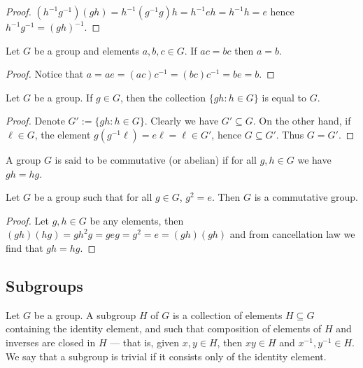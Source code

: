 \begin{proof}
\((h^{-1} g^{-1})(g h) = h^{-1} (g^{-1} g) h = h^{-1} e h = h^{-1} h = e\)
hence \(h^{-1} g^{-1} = (g h)^{-1}\).
\end{proof}

\begin{proposition}[Cancellation]
Let \(G\) be a group and elements \(a, b, c \in G\). If \(a c = b c\) then
\(a = b\).
\end{proposition}

\begin{proof}
Notice that \(a = a e = (a c) c^{-1} = (b c) c^{-1} = b e = b\).
\end{proof}

\begin{proposition}
Let \(G\) be a group. If \(g \in G\), then the collection \(\{g h: h \in G\}\)
is equal to \(G\).
\end{proposition}

\begin{proof}
Denote \(G' := \{g h: h \in G\}\). Clearly we have \(G' \subseteq G\). On the
other hand, if \(\ell \in G\), the element \(g (g^{-1} \ell) = e \ell = \ell
\in G'\), hence \(G \subseteq G'\). Thus \(G = G'\).
\end{proof}

\begin{definition}
A group \(G\) is said to be commutative (or abelian) if for all \(g, h \in G\)
we have \(g h = h g\).
\end{definition}

\begin{corollary}
Let \(G\) be a group such that for all \(g \in G\), \(g^2 = e\). Then \(G\) is
a commutative group.
\end{corollary}

\begin{proof}
Let \(g, h \in G\) be any elements, then \((g h) (h g) = g h^2 g = g e g = g^2
= e = (g h) (g h)\) and from cancellation law we find that \(g h = h g\).
\end{proof}

\subsection{Subgroups}

\begin{definition}[Subgroup]
\label{def:subgroup}
Let \(G\) be a group. A subgroup \(H\) of \(G\) is a collection of elements \(H
\subseteq G\) containing the identity element, and such that composition of
elements of \(H\) and inverses are closed in \(H\) --- that is, given \(x, y \in
H\), then \(xy \in H\) and \(x^{-1}, y^{-1} \in H\). We say that a subgroup is
trivial if it consists only of the identity element.
\end{definition}

